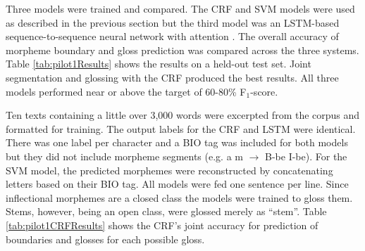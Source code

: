 Three models were trained and compared. The CRF and SVM models were used as described in the previous section but the third model was an LSTM-based sequence-to-sequence neural network \citep{sutskever2014} with attention \citep{bahdanau2014}. 
The overall accuracy of morpheme boundary and gloss prediction was compared across the three systems. Table \ref{tab:pilot1Results} shows the results on a held-out test set. Joint segmentation and glossing with the CRF produced the best results. All three models performed near or above the target of 60-80\% F$_1$-score.

Ten texts containing a little over 3,000 words were excerpted from the corpus and formatted for training. The output labels for the CRF and LSTM were identical. There was one label per character and a BIO tag was included for both models but they did not include morpheme segments (e.g. a m $\longrightarrow$ B-be I-be). For the SVM model, the predicted morphemes were reconstructed by concatenating letters based on their BIO tag. All models were fed one sentence per line. Since inflectional morphemes are a closed class the models were trained to gloss them. Stems, however, being an open class, were glossed merely as ``stem''. Table \ref{tab:pilot1CRFResults} shows the CRF's joint accuracy for prediction of boundaries and glosses for each possible gloss. 

